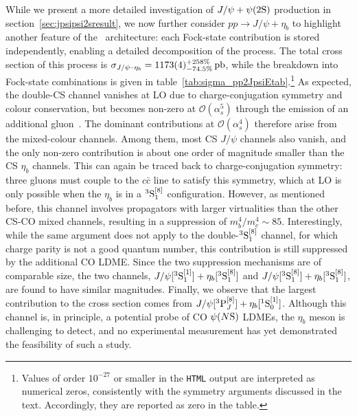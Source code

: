 While we present a more detailed investigation of $J/\psi+\psi(2\mathrm{S})$ production in section~\ref{sec:jpsipsi2sresult}, we now further consider $pp \to J/\psi + \eta_b$ to highlight another feature of the \mgshort\ architecture: each  Fock-state contribution is stored independently, enabling a detailed decomposition of the process. 
The total cross section of this process is $\sigma_{J/\psi\textrm{--}\eta_b} = 1173(4)^{+258\%}_{-74.5\%}\,{\rm pb}$, while the breakdown into Fock-state combinations is given in table~\ref{tab:sigma_pp2JpsiEtab}.\footnote{Values of order $10^{-27}$ or smaller in the {\tt HTML} output are interpreted as numerical zeros, consistently with the symmetry arguments discussed in the text. Accordingly, they are reported as zero in the table.} 
As expected, the double-CS channel vanishes at LO due to charge-conjugation symmetry and colour conservation, but becomes non-zero at $\mathcal{O}(\alpha_s^5)$ through the emission of an additional gluon~\cite{Lansberg:2013qka}. The dominant contributions at $\mathcal{O}(\alpha_s^4)$ therefore arise from the mixed-colour channels. 
Among them, most CS $J/\psi$ channels also vanish, and the only non-zero contribution is about one order of magnitude smaller than the CS $\eta_b$ channels. This can again be traced back to charge-conjugation symmetry: three gluons must couple to the $c \bar{c}$ line to satisfy this symmetry, which at LO is only possible when the $\eta_b$ is in a $^3 \mathrm{S}_1^{[8]}$ configuration. However, as mentioned before, this channel involves propagators with larger virtualities than the other CS-CO mixed channels, resulting in a suppression of $m_b^4/m_c^4 \sim 85$. 
Interestingly, while the same argument does not apply to the double-$^3 \mathrm{S}_1^{[8]}$ channel, for which charge parity is not a good quantum number, this contribution is still suppressed by the additional CO LDME. Since the two suppression mechanisms are of comparable size, the two channels, $J/\psi[^3\mathrm{S}_1^{[1]}]+\eta_b[^3\mathrm{S}_1^{[8]}]$ and $J/\psi[^3\mathrm{S}_1^{[8]}]+\eta_b[^3\mathrm{S}_1^{[8]}]$, are found to have similar magnitudes.
Finally, we observe that the largest contribution to the cross section comes from $J/\psi[^3\mathrm{P}_J^{[8]}]+\eta_b[^1\mathrm{S}_0^{[1]}]$.
Although this channel is, in principle, a potential probe of CO $\psi(N\mathrm{S})$ LDMEs, the $\eta_b$ meson is challenging to detect, and no experimental measurement has yet demonstrated the feasibility of such a study.


